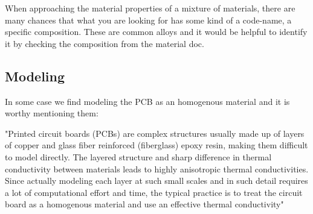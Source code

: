 \documentclass[final]{cubedoc}
\begin{document}
	When approaching the material properties of a mixture of materials, there are many chances that what you are looking for has some kind of a code-name, a specific composition. These are common alloys and it would be helpful to identify it by checking the composition from the material doc. 
	
	
	\subsection{Modeling}
	\label{subsec:modeling}
	
	
	
	
	
	In some case we find modeling the PCB as an homogenous material and it is worthy mentioning them:
	
	
	"Printed circuit boards (PCBs) are complex structures usually made up of layers of copper and glass fiber reinforced (fiberglass) epoxy resin, making them difficult to model directly. The layered structure and sharp difference in thermal conductivity between materials leads to highly anisotropic thermal conductivities. Since actually modeling each layer at such small scales and in such detail requires a lot of computational effort and time, the typical practice is to treat the circuit board as a homogenous material and use an effective thermal conductivity" \cite{peake2014cubesat}
	
\end{document}
